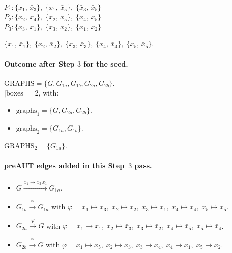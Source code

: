 \begin{enumerate}[label=\textbf{\arabic*.}, leftmargin=*]
\begin{description}[style=nextline, font=\normalfont\bfseries]
\item[Purple edges ($9$)]\mbox{}\\
$P_{1}: \{x_{1},\,\bar{x}_{3}\},\; \{x_{1},\,\bar{x}_{5}\},\; \{\bar{x}_{3},\,\bar{x}_{5}\}$\\
$P_{2}: \{x_{2},\,x_{4}\},\; \{x_{2},\,x_{5}\},\; \{x_{4},\,x_{5}\}$\\
$P_{3}: \{x_{3},\,\bar{x}_{1}\},\; \{x_{3},\,\bar{x}_{2}\},\; \{\bar{x}_{1},\,\bar{x}_{2}\}$
\item[Black edges ($5$)] $\displaystyle \{x_{1},\,\bar{x}_{1}\},\; \{x_{2},\,\bar{x}_{2}\},\; \{x_{3},\,\bar{x}_{3}\},\; \{x_{4},\,\bar{x}_{4}\},\; \{x_{5},\,\bar{x}_{5}\}$.
\end{description}
\end{enumerate}

\paragraph{Outcome after Step $3$ for the seed.}
$\mathrm{GRAPHS}=\{G, G_{1a}, G_{1b}, G_{2a}, G_{2b}\}$.\\
$|\mathrm{boxes}|=2$, with:
\begin{itemize}[leftmargin=*]
\item $\mathrm{graphs}_{1}=\{G, G_{2a}, G_{2b}\}$.
\item $\mathrm{graphs}_{2}=\{G_{1a}, G_{1b}\}$.
\end{itemize}
$\mathrm{GRAPHS}_{2}=\{G_{1a}\}$.

\paragraph{preAUT edges added in this Step~$3$ pass.}
\begin{itemize}[leftmargin=*]
\item $G \xrightarrow{x_{1} \to \bar{x}_{3}\,x_{1}} G_{1a}$.
\item $G_{1b} \xrightarrow{\varphi} G_{1a}$ with $\varphi=x_{1} \mapsto \bar{x}_{3},\; x_{2} \mapsto x_{2},\; x_{3} \mapsto \bar{x}_{1},\; x_{4} \mapsto x_{4},\; x_{5} \mapsto x_{5}$.
\item $G_{2a} \xrightarrow{\varphi} G$ with $\varphi=x_{1} \mapsto x_{1},\; x_{2} \mapsto \bar{x}_{3},\; x_{3} \mapsto \bar{x}_{2},\; x_{4} \mapsto \bar{x}_{5},\; x_{5} \mapsto \bar{x}_{4}$.
\item $G_{2b} \xrightarrow{\varphi} G$ with $\varphi=x_{1} \mapsto x_{5},\; x_{2} \mapsto x_{3},\; x_{3} \mapsto \bar{x}_{4},\; x_{4} \mapsto \bar{x}_{1},\; x_{5} \mapsto \bar{x}_{2}$.
\end{itemize}
